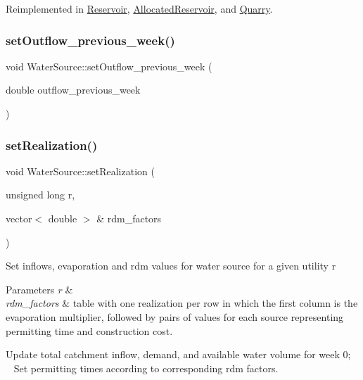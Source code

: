 Reimplemented in \mbox{\hyperlink{classReservoir_ac6f64dd92c401e58095e7b125855041b}{Reservoir}}, \mbox{\hyperlink{classAllocatedReservoir_a739d93f7981f597a3db0a3d613304b8e}{Allocated\+Reservoir}}, and \mbox{\hyperlink{classQuarry_af5fe04fa188d399485b2b4e64381e169}{Quarry}}.

\mbox{\label{classWaterSource_ab53d376a425b8db603382ba27b52b1d4}} 
\subsubsection{\texorpdfstring{set\+Outflow\+\_\+previous\+\_\+week()}{setOutflow\_previous\_week()}}
{\footnotesize\ttfamily void Water\+Source\+::set\+Outflow\+\_\+previous\+\_\+week (\begin{DoxyParamCaption}\item[{double}]{outflow\+\_\+previous\+\_\+week }\end{DoxyParamCaption})}

\mbox{\label{classWaterSource_af72660e62fda45b6ae53da5f0afd86db}} 
\subsubsection{\texorpdfstring{set\+Realization()}{setRealization()}}
{\footnotesize\ttfamily void Water\+Source\+::set\+Realization (\begin{DoxyParamCaption}\item[{unsigned long}]{r,  }\item[{vector$<$ double $>$ \&}]{rdm\+\_\+factors }\end{DoxyParamCaption})\hspace{0.3cm}{\ttfamily [virtual]}}

Set inflows, evaporation and rdm values for water source for a given utility r 
\begin{DoxyParams}{Parameters}
{\em r} & \\
\hline
{\em rdm\+\_\+factors} & table with one realization per row in which the first column is the evaporation multiplier, followed by pairs of values for each source representing permitting time and construction cost. \\
\hline
\end{DoxyParams}
Update total catchment inflow, demand, and available water volume for week 0; ~\newline
~\newline
 Set permitting times according to corresponding rdm factors.

